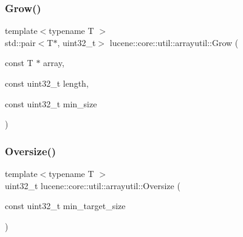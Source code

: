 \subsubsection{\texorpdfstring{Grow()}{Grow()}}
{\footnotesize\ttfamily template$<$typename T $>$ \\
std\+::pair$<$T$\ast$, uint32\+\_\+t$>$ lucene\+::core\+::util\+::arrayutil\+::\+Grow (\begin{DoxyParamCaption}\item[{const T $\ast$}]{array,  }\item[{const uint32\+\_\+t}]{length,  }\item[{const uint32\+\_\+t}]{min\+\_\+size }\end{DoxyParamCaption})}

\mbox{\label{namespacelucene_1_1core_1_1util_1_1arrayutil_a88b54ef3001bf083cb1262383618c841}} 
\subsubsection{\texorpdfstring{Oversize()}{Oversize()}}
{\footnotesize\ttfamily template$<$typename T $>$ \\
uint32\+\_\+t lucene\+::core\+::util\+::arrayutil\+::\+Oversize (\begin{DoxyParamCaption}\item[{const uint32\+\_\+t}]{min\+\_\+target\+\_\+size }\end{DoxyParamCaption})}

